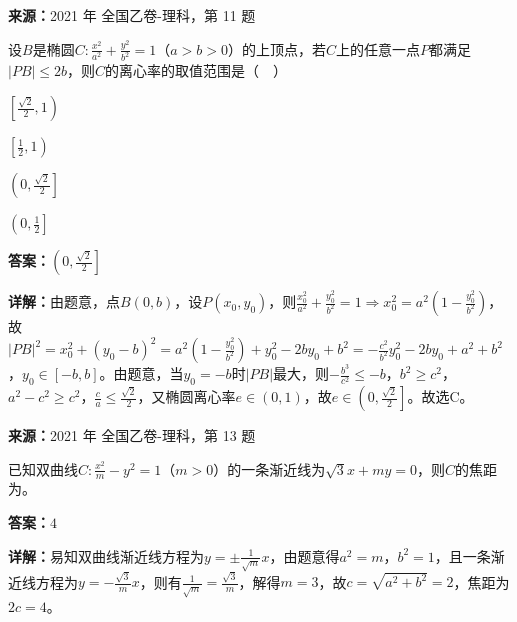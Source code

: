 \begin{question}[points=5]
\textbf{来源：}2021 年 全国乙卷-理科，第 11 题\par
设$B$是椭圆$C:\frac{x^2}{a^2}+\frac{y^2}{b^2}=1$（$a>b>0$）的上顶点，若$C$上的任意一点$P$都满足$|PB|\leq 2b$，则$C$的离心率的取值范围是（  ）
\begin{choices}
  \item $\left[\frac{\sqrt{2}}{2},1\right)$
  \item $\left[\frac12,1\right)$
  \item $\left(0,\frac{\sqrt{2}}{2}\right]$
  \item $\left(0,\frac12\right]$
\end{choices}
\begin{solution}
\textbf{答案：}$\left(0,\frac{\sqrt{2}}{2}\right]$

\textbf{详解：}由题意，点$B(0,b)$，设$P(x_0,y_0)$，则$\frac{x_0^2}{a^2}+\frac{y_0^2}{b^2}=1\Rightarrow x_0^2=a^2\left(1-\frac{y_0^2}{b^2}\right)$，故$|PB|^2=x_0^2+(y_0-b)^2=a^2\left(1-\frac{y_0^2}{b^2}\right)+y_0^2-2by_0+b^2=-\frac{c^2}{b^2}y_0^2-2by_0+a^2+b^2$，$y_0\in[-b,b]$。由题意，当$y_0=-b$时$|PB|$最大，则$-\frac{b^3}{c^2}\leq -b$，$b^2\geq c^2$，$a^2-c^2\geq c^2$，$\frac{c}{a}\leq\frac{\sqrt{2}}{2}$，又椭圆离心率$e\in(0,1)$，故$e\in\left(0,\frac{\sqrt{2}}{2}\right]$。故选C。
\end{solution}
\end{question}

\begin{question}[points=5]
\textbf{来源：}2021 年 全国乙卷-理科，第 13 题\par
已知双曲线$C:\frac{x^2}{m}-y^2=1$（$m>0$）的一条渐近线为$\sqrt{3}x+my=0$，则$C$的焦距为。
\fillin[{$4$}]
\begin{solution}
\textbf{答案：}$4$

\textbf{详解：}易知双曲线渐近线方程为$y=\pm\frac{1}{\sqrt{m}}x$，由题意得$a^2=m$，$b^2=1$，且一条渐近线方程为$y=-\frac{\sqrt{3}}{m}x$，则有$\frac{1}{\sqrt{m}}=\frac{\sqrt{3}}{m}$，解得$m=3$，故$c=\sqrt{a^2+b^2}=2$，焦距为$2c=4$。
\end{solution}
\end{question}

